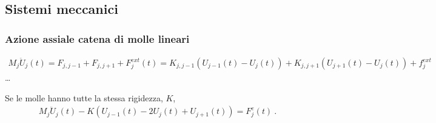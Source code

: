 \documentclass[letterpaper,10pt,italian]{jupyterBook}
\begin{document}
\subsection{Sistemi meccanici}
\label{\detokenize{ch/waves/intro:sistemi-meccanici}}\label{\detokenize{ch/waves/intro:physics-hs-waves-equation-examples-mechanics}}

\subsubsection{Azione assiale \sphinxhyphen{} catena di molle lineari}
\label{\detokenize{ch/waves/intro:azione-assiale-catena-di-molle-lineari}}\label{\detokenize{ch/waves/intro:physics-hs-waves-equation-examples-mechanics-axial}}\begin{equation*}
\begin{split}M_j \ddot{U}_j(t) = F_{j,j-1} + F_{j,j+1} + F_j^{ext}(t) = K_{j,j-1} \left( U_{j-1}(t) - U_j(t) \right) + K_{j,j+1} \left( U_{j+1}(t) - U_{j}(t) \right) + f_j^{ext}\end{split}
\end{equation*}
\sphinxAtStartPar
…

\sphinxAtStartPar
Se le molle hanno tutte la stessa rigidezza, \(K\),
\begin{equation}\label{equation:ch/waves/intro:eq:axial:discrete:index}
\begin{split}M_j \ddot{U}_j(t) - K \left( U_{j-1}(t) - 2 U_j(t) + U_{j+1}(t) \right) =  F^e_j(t) \ .\end{split}
\end{equation}
\sphinxAtStartPar
{}
\end{document}
